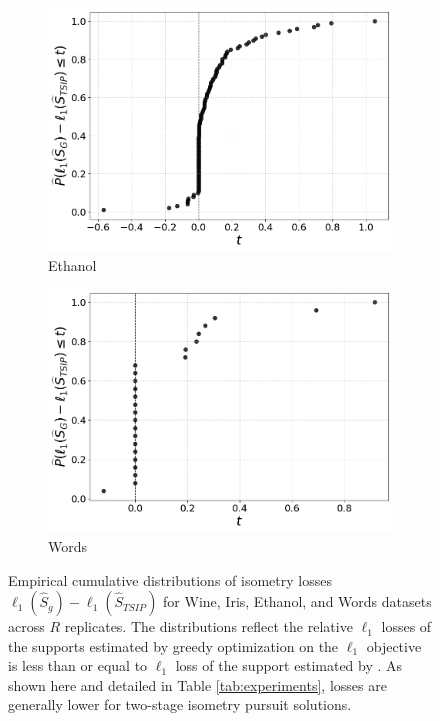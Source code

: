 \begin{figure}[t]
    \begin{subfigure}[b]{0.45\textwidth}
        \centering
        \includegraphics[width=\textwidth]{../figures/ethanol_isometry_losses_ecdf}
        \caption{Ethanol}
        \label{fig:ethanol_isometry_losses}
    \end{subfigure}
    \hfill
    \begin{subfigure}[b]{0.45\textwidth}
        \centering
        \includegraphics[width=\textwidth]{../figures/words_ecdf}
        \caption{Words}
        \label{fig:words_isometry_losses}
    \end{subfigure}
    \caption{Empirical cumulative distributions of isometry losses $\ell_1(\widehat{S}_g) - \ell_1(\widehat{S}_{TSIP})$ for Wine, Iris, Ethanol, and Words datasets across $R$ replicates.
    The distributions reflect the relative $\ell_1$ losses of the supports estimated by greedy optimization on the $\ell_1$ objective is less than or equal to $\ell_1$ loss of the support estimated by \tsip.
    As shown here and detailed  in Table \ref{tab:experiments}, losses are generally lower for two-stage isometry pursuit solutions.}
    \label{fig:isometry_losses}
\end{figure}


